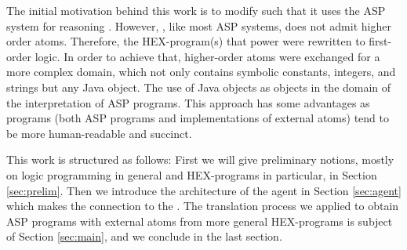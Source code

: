 The initial motivation behind this work is to modify \ah such that it uses the \al ASP system for reasoning \cite{blend}. However, \al, like most ASP systems, does not admit higher order atoms. Therefore, the HEX-program(s) that power \ah were rewritten to first-order logic. In order to achieve that, higher-order atoms were exchanged for a more complex domain, which not only contains symbolic constants, integers, and strings but any Java object. The use of Java objects as objects in the domain of the interpretation of ASP programs. This approach has some advantages as programs (both ASP programs and implementations of external atoms) tend to be more human-readable and succinct.

This work is structured as follows: First we will give preliminary notions, mostly on logic programming in general and HEX-programs in particular, in Section \ref{sec:prelim}. Then we introduce the architecture of the \ah agent in Section \ref{sec:agent} which makes the connection to the \abc. The translation process we applied to obtain ASP programs with external atoms from more general HEX-programs is subject of Section \ref{sec:main}, and we  conclude in the last section.